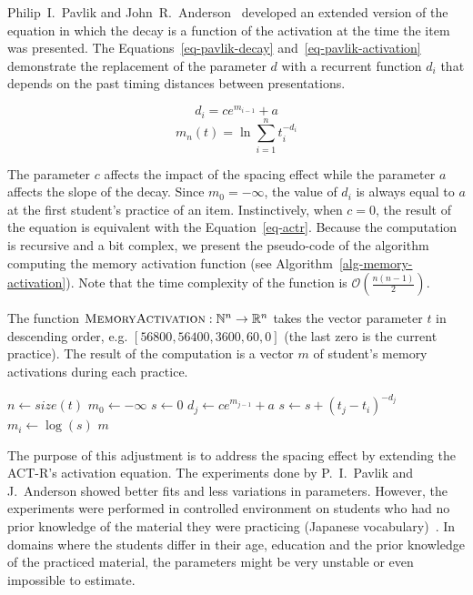 Philip~I.~Pavlik and John~R.~Anderson~\cite{Pavlik2005} developed an extended version of the equation in which the decay is a function of the activation at the time the item was presented. The Equations~\ref{eq-pavlik-decay} and~\ref{eq-pavlik-activation} demonstrate the replacement of the parameter $d$ with a recurrent function $d_i$ that depends on the past timing distances between presentations.

\begin{equation} \label{eq-pavlik-decay}
  d_i = ce^{m_{i-1}} + a
\end{equation}
\begin{equation} \label{eq-pavlik-activation}
  m_n(t) = \ln{\sum_{i=1}^{n} t_{i}^{-d_i}}
\end{equation}

The parameter $c$ affects the impact of the spacing effect while the parameter $a$ affects the slope of the decay. Since $m_0 = -\infty$, the value of $d_i$ is always equal to $a$ at the first student's practice of an item. Instinctively, when $c = 0$, the result of the equation is equivalent with the Equation~\ref{eq-actr}. Because the computation is recursive and a bit complex, we present the pseudo-code of the algorithm computing the memory activation function (see Algorithm~\ref{alg-memory-activation}). Note that the time complexity of the function is $\mathcal{O}\left(\frac{n(n-1)}{2}\right)$.

\begin{algorithm}
  \caption{The function $\textsc{MemoryActivation}: \mathbb{N}^n \rightarrow \mathbb{R}^n$ takes the vector parameter $t$ in descending order, e.g. $[56800, 56400, 3600, 60, 0]$ (the last zero is the current practice). The result of the computation is a vector $m$ of student's memory activations during each practice.}
  \label{alg-memory-activation}
  \begin{algorithmic}[1]
      \State $n \gets size(t)$
      \State $m_0 \gets -\infty$
        \State $s \gets 0$
          \State $d_j \gets ce^{m_{j-1}} + a$
          \State $s \gets s + (t_j - t_i)^{-d_j}$
        \EndFor
        \State $m_i \gets \log(s)$
      \EndFor
      \State \Return $m$
    \EndFunction
  \end{algorithmic}
\end{algorithm}

The purpose of this adjustment is to address the spacing effect by extending the ACT-R's activation equation. The experiments done by P.~I.~Pavlik and J.~Anderson showed better fits and less variations in parameters. However, the experiments were performed in controlled environment on students who had no prior knowledge of the material they were practicing (Japanese vocabulary)~\cite{Pavlik2005}. In domains where the students differ in their age, education and the prior knowledge of the practiced material, the parameters might be very unstable or even impossible to estimate.
